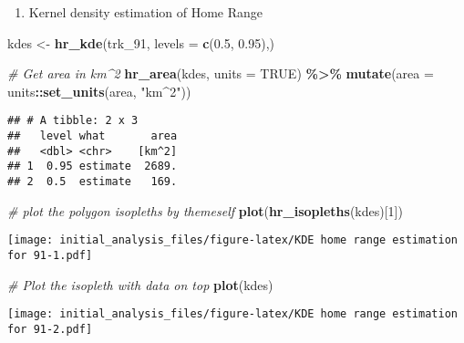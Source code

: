 \documentclass[
]{article}
\newenvironment{Shaded}{\begin{snugshade}}{\end{snugshade}}
\newcommand{\AttributeTok}[1]{\textcolor[rgb]{0.13,0.29,0.53}{#1}}
\newcommand{\CommentTok}[1]{\textcolor[rgb]{0.56,0.35,0.01}{\textit{#1}}}
\newcommand{\ConstantTok}[1]{\textcolor[rgb]{0.56,0.35,0.01}{#1}}
\newcommand{\DecValTok}[1]{\textcolor[rgb]{0.00,0.00,0.81}{#1}}
\newcommand{\FloatTok}[1]{\textcolor[rgb]{0.00,0.00,0.81}{#1}}
\newcommand{\FunctionTok}[1]{\textcolor[rgb]{0.13,0.29,0.53}{\textbf{#1}}}
\newcommand{\NormalTok}[1]{#1}
\newcommand{\OtherTok}[1]{\textcolor[rgb]{0.56,0.35,0.01}{#1}}
\newcommand{\SpecialCharTok}[1]{\textcolor[rgb]{0.81,0.36,0.00}{\textbf{#1}}}
\newcommand{\StringTok}[1]{\textcolor[rgb]{0.31,0.60,0.02}{#1}}
\providecommand{\tightlist}{%
  \setlength{\itemsep}{0pt}\setlength{\parskip}{0pt}}
\begin{document}
\begin{enumerate}
\def\labelenumi{\alph{enumi}.}
\setcounter{enumi}{1}
\tightlist
\item
  Kernel density estimation of Home Range
\end{enumerate}

\begin{Shaded}
\begin{Highlighting}[]
\NormalTok{kdes }\OtherTok{\textless{}{-}} \FunctionTok{hr\_kde}\NormalTok{(trk\_91, }\AttributeTok{levels =} \FunctionTok{c}\NormalTok{(}\FloatTok{0.5}\NormalTok{, }\FloatTok{0.95}\NormalTok{),)}

\CommentTok{\# Get area in km\^{}2}
\FunctionTok{hr\_area}\NormalTok{(kdes, }\AttributeTok{units =} \ConstantTok{TRUE}\NormalTok{) }\SpecialCharTok{\%\textgreater{}\%} 
  \FunctionTok{mutate}\NormalTok{(}\AttributeTok{area =}\NormalTok{ units}\SpecialCharTok{::}\FunctionTok{set\_units}\NormalTok{(area, }\StringTok{"km\^{}2"}\NormalTok{))}
\end{Highlighting}
\end{Shaded}

\begin{verbatim}
## # A tibble: 2 x 3
##   level what       area
##   <dbl> <chr>    [km^2]
## 1  0.95 estimate  2689.
## 2  0.5  estimate   169.
\end{verbatim}

\begin{Shaded}
\begin{Highlighting}[]
\CommentTok{\# plot the polygon isopleths by themeself}
\FunctionTok{plot}\NormalTok{(}\FunctionTok{hr\_isopleths}\NormalTok{(kdes)[}\DecValTok{1}\NormalTok{])}
\end{Highlighting}
\end{Shaded}

\texttt{[image: initial\_analysis\_files/figure-latex/KDE home range estimation for 91-1.pdf]}

\begin{Shaded}
\begin{Highlighting}[]
\CommentTok{\# Plot the isopleth with data on top}
\FunctionTok{plot}\NormalTok{(kdes) }
\end{Highlighting}
\end{Shaded}

\texttt{[image: initial\_analysis\_files/figure-latex/KDE home range estimation for 91-2.pdf]}
\end{document}

